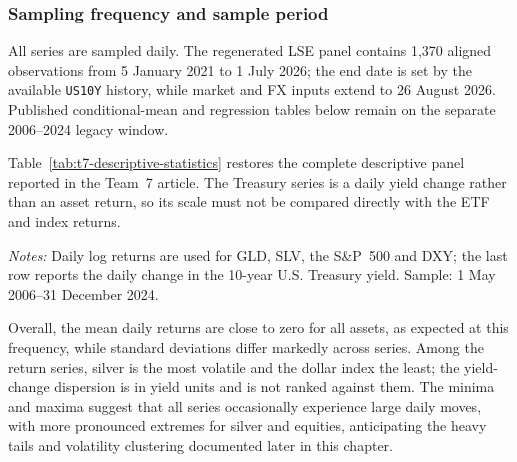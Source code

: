 \subsubsection{Sampling frequency and sample period}

All series are sampled daily. The regenerated LSE panel contains 1,370 aligned
observations from 5 January 2021 to 1 July 2026; the end date is set by the
available \texttt{US10Y} history, while market and FX inputs extend to 26
August 2026. Published conditional-mean and regression tables below remain on
the separate 2006--2024 legacy window.

Table~\ref{tab:t7-descriptive-statistics} restores the complete descriptive
panel reported in the Team~7 article. The Treasury series is a daily yield
change rather than an asset return, so its scale must not be compared directly
with the ETF and index returns.

\begin{table}[htbp]
\centering
\caption{Descriptive statistics for the synchronized Team~7 sample}
\label{tab:t7-descriptive-statistics}
\small
{}
\begin{minipage}{0.96\textwidth}
\footnotesize\emph{Notes:} Daily log returns are used for GLD, SLV, the
S\&P~500 and DXY; the last row reports the daily change in the 10-year U.S.
Treasury yield. Sample: 1 May 2006--31 December 2024.
\end{minipage}
\end{table}


Overall, the mean daily returns are close to zero for all assets, as expected at this
frequency, while standard deviations differ markedly across series. Among the return series,
silver is the most volatile and the dollar index the least; the yield-change
dispersion is in yield units and is not ranked against them. The minima and maxima
suggest that all series occasionally experience large daily moves, with more pronounced
extremes for silver and equities, anticipating the heavy tails and volatility clustering
documented later in this chapter.
